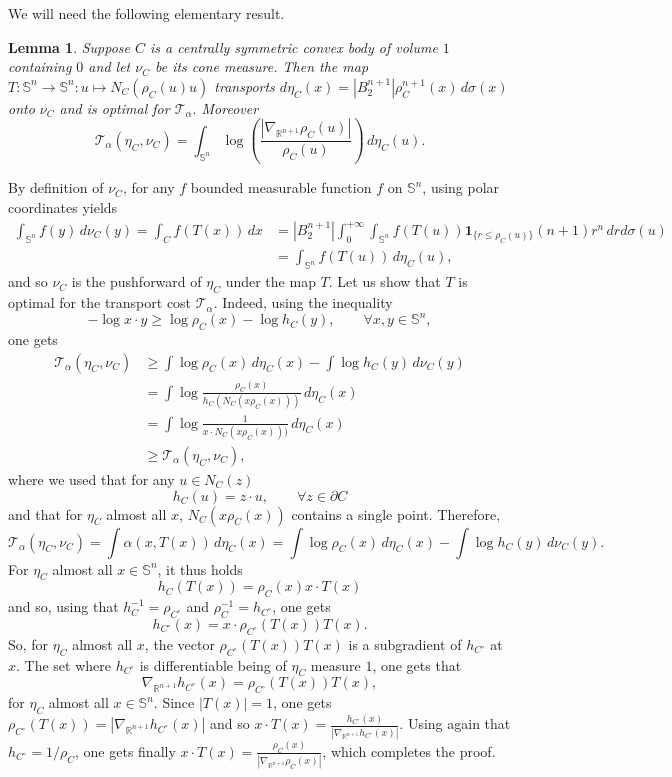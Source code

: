 \documentclass[10pt]{amsart}
\newtheorem{lem}[thm]{Lemma}
\theoremstyle{definition}
\theoremstyle{remark}
\newcommand{\R}{\mathbb{R}}
\newcommand{\Sd}{\mathbb{S}}
\begin{document}
We will need the following elementary result.
\begin{lem}\label{lem:cone2}
Suppose $C$ is a centrally symmetric convex body of volume $1$ containing $0$ and let $\nu_C$ be its cone measure. Then the map $T :\Sd^n \to \Sd^n : u\mapsto N_C(\rho_C(u)u)$ transports $
d\eta_C(x) = |B_2^{n+1}|\rho_C^{n+1}(x)\,d\sigma(x)$
onto $\nu_C$ and is optimal for $\mathcal{T}_\alpha.$ Moreover
\[
\mathcal{T}_\alpha (\eta_C,\nu_C) = \int_{\Sd^n} \log \left(\frac{|\nabla_{\R^{n+1}} \rho_C(u)|}{\rho_C(u)}\right)\,d\eta_C(u).
\]
\end{lem}
\proof
By definition of $\nu_C$, for any $f$ bounded measurable function $f$ on $\Sd^n$, using polar coordinates yields
\begin{align*}
\int_{\Sd^n} f(y)\,d\nu_C(y) = \int_{C} f(T(x))\,dx&= |B_2^{n+1}| \int_0^{+\infty} \int_{\Sd^n} f(T(u))\mathbf{1}_{\{r\leq \rho_C(u)\}} (n+1)r^{n}\,dr d\sigma(u)\\
& = \int_{\Sd^n} f(T(u))\, d\eta_C(u),
\end{align*}
and so $\nu_C$ is the pushforward of $\eta_C$ under the map $T$.
Let us show that $T$ is optimal for the transport cost $\mathcal{T}_\alpha$. Indeed, using the inequality
\begin{equation}\label{eq:rho-h}
- \log x\cdot y \geq \log \rho_C(x) - \log h_C(y),\qquad \forall x,y \in \Sd^n,
\end{equation}
one gets
\begin{align*}
\mathcal{T}_\alpha(\eta_C,\nu_C) & \geq \int \log \rho_C(x)\,d\eta_C(x) - \int \log h_C(y)\,d\nu_C(y)\\
& = \int \log \frac{\rho_C(x)}{h_C(N_C(x\rho_C(x)))}\,d\eta_C(x)\\
& = \int \log \frac{1}{x\cdot N_C(x\rho_C(x)))}\,d\eta_C(x)\\
& \geq \mathcal{T}_\alpha(\eta_C,\nu_C),
\end{align*}
where we used that for any $u \in N_C(z)$
\[
h_C(u) = z\cdot u,\qquad \forall z\in \partial C
\]
and that for $\eta_C$ almost all $x$, $N_C(x\rho_C(x))$ contains a single point.
Therefore,
\begin{equation}\label{eq:nuCmuC}
\mathcal{T}_\alpha(\eta_C,\nu_C) = \int \alpha(x,T(x))\,d\eta_C(x) = \int \log \rho_C(x)\,d\eta_C(x) - \int \log h_C(y)\,d\nu_C(y).
\end{equation}
For $\eta_C$ almost all $x \in \Sd^n$, it thus holds 
\[
h_C(T(x)) = \rho_C(x) x\cdot T(x)
\]
and so, using that $h_{C}^{-1} = \rho_{C^\circ}$ and $\rho_C^{-1} = h_{C^\circ}$, one gets
\[
h_{C^\circ}(x) =  x \cdot \rho_{C^\circ} (T(x))T(x).
\]
So, for $\eta_C$ almost all $x$, the vector $\rho_{C^\circ} (T(x)) T(x)$ is a subgradient of $h_{C^\circ}$ at $x$. The set where $h_{C^\circ}$ is differentiable being of $\eta_C$ measure $1$, one gets that
\[
\nabla_{\R^{n+1}} h_{C^\circ} (x) = \rho_{C^\circ} (T(x)) T(x),
\]
for $\eta_C$ almost all $x\in \Sd^n$.
Since $|T(x)|=1$, one gets $\rho_{C^\circ}(T(x)) = |\nabla_{\R^{n+1}} h_{C^\circ}(x)|$ and so $x\cdot T(x) = \frac{h_{C^\circ} (x)}{|\nabla_{\R^{n+1}} h_{C^\circ}(x)|}$. Using again that $h_{C^\circ} = 1/\rho_{C}$, one gets finally $x\cdot T(x) = \frac{\rho_C(x)}{|\nabla_{\R^{n+1}} \rho_{C}(x)|}$, which completes the proof.
\endproof
\end{document}
